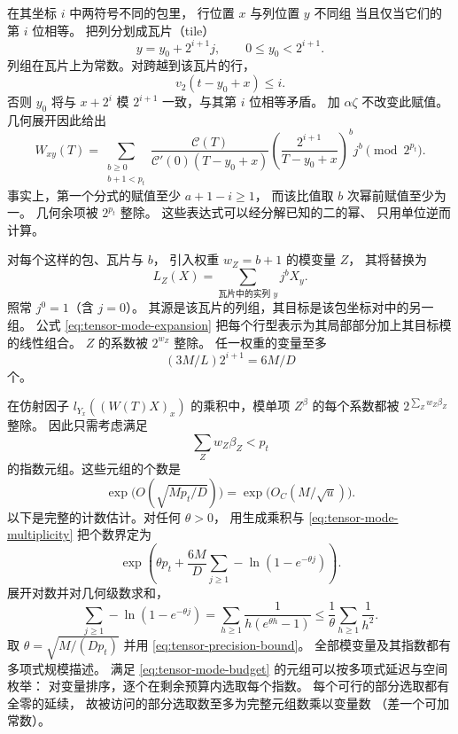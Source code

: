 在其坐标 $i$ 中两符号不同的包里，
行位置 $x$ 与列位置 $y$ 不同组
当且仅当它们的第 $i$ 位相等。
把列分划成瓦片（tile）
\[
 y=y_0+2^{i+1}j,\qquad 0\le y_0<2^{i+1}.
\]
列组在瓦片上为常数。对跨越到该瓦片的行，
\[
 v_2(t-y_0+x)\le i.
\]
否则 $y_0$ 将与 $x+2^i$ 模 $2^{i+1}$
一致，与其第 $i$ 位相等矛盾。
加 $\alpha\zeta$ 不改变此赋值。
几何展开因此给出
\begin{equation}\label{eq:tensor-mode-expansion}
 W_{xy}(T)=
 \sum_{\substack{b\ge0\\b+1<p_t}}
 \frac{\mathcal C(T)}
      {\mathcal C'(0)(T-y_0+x)}
 \left(\frac{2^{i+1}}{T-y_0+x}\right)^b j^b
 \pmod {2^{p_t}}.
\end{equation}
事实上，第一个分式的赋值至少 $a+1-i\ge1$，
而该比值取 $b$ 次幂前赋值至少为一。
几何余项被 $2^{p_t}$ 整除。
这些表达式可以经分解已知的二的幂、
只用单位逆而计算。

对每个这样的包、瓦片与 $b$，
引入权重 $w_Z=b+1$ 的模变量 $Z$，
其将替换为
\[
 L_Z(X)=\sum_{\text{瓦片中的实列 }y}j^bX_y.
\]
照常 $j^0=1$（含 $j=0$）。
其源是该瓦片的列组，其目标是该包坐标对中的另一组。
公式 \eqref{eq:tensor-mode-expansion}
把每个行型表示为其局部部分加上其目标模的线性组合。
$Z$ 的系数被 $2^{w_Z}$ 整除。
任一权重的变量至多
\begin{equation}\label{eq:tensor-mode-multiplicity}
 (3M/L)2^{i+1}=6M/D
\end{equation}
个。

在仿射因子 $l_{Y_x}((W(T)X)_x)$
的乘积中，模单项 $Z^\beta$
的每个系数都被
$2^{\sum_Zw_Z\beta_Z}$ 整除。
因此只需考虑满足
\begin{equation}\label{eq:tensor-mode-budget}
 \sum_Zw_Z\beta_Z<p_t
\end{equation}
的指数元组。这些元组的个数是
\begin{equation}\label{eq:tensor-partition-count}
 \exp\bigl(O(\sqrt{Mp_t/D})\bigr)
       =\exp\bigl(O_C(M/\sqrt u)\bigr).
\end{equation}
以下是完整的计数估计。对任何 $\theta>0$，
用生成乘积与 \eqref{eq:tensor-mode-multiplicity}
把个数界定为
\[
 \exp\left(\theta p_t+\frac{6M}{D}
                   \sum_{j\ge1}-\ln(1-e^{-\theta j})\right).
\]
展开对数并对几何级数求和，
\[
 \sum_{j\ge1}-\ln(1-e^{-\theta j})
  =\sum_{h\ge1}\frac1{h(e^{\theta h}-1)}
  \le\frac1\theta\sum_{h\ge1}\frac1{h^2}.
\]
取 $\theta=\sqrt{M/(Dp_t)}$ 并用
\eqref{eq:tensor-precision-bound}。
全部模变量及其指数都有多项式规模描述。
满足 \eqref{eq:tensor-mode-budget}
的元组可以按多项式延迟与空间枚举：
对变量排序，逐个在剩余预算内选取每个指数。
每个可行的部分选取都有全零的延续，
故被访问的部分选取数至多为完整元组数乘以变量数
（差一个可加常数）。

